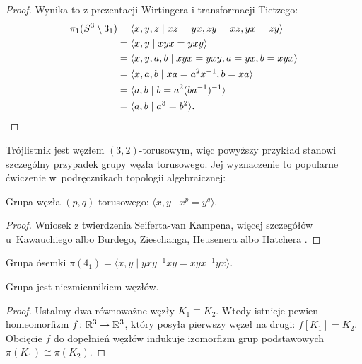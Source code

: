 \begin{proof}
    Wynika to z prezentacji Wirtingera i transformacji Tietzego:
    \begin{align}
        \pi_1(S^3 \setminus 3_1) & = \langle x, y, z \mid xz = yx, zy = xz, yx = zy \rangle \\
                                 & = \langle x, y \mid xyx = yxy \rangle \\
                                 & = \langle x, y, a, b \mid xyx = yxy, a = yx, b = xyx \rangle \\
                                 & = \langle x, a, b \mid xa = a^2x^{-1}, b = xa \rangle \\
                                 & = \langle a, b \mid b = a^2(ba^{-1})^{-1} \rangle \\
                                 & = \langle a, b \mid a^3 = b^2 \rangle.
                                 \qedhere
    \end{align}
\end{proof}

Trójlistnik jest węzłem $(3, 2)$-torusowym, więc powyższy przykład stanowi szczególny przypadek grupy węzła torusowego.
Jej wyznaczenie to popularne ćwiczenie w~podręcznikach topologii algebraicznej:

\begin{example}
    Grupa węzła $(p,q)$-torusowego: $\langle x, y \mid x^p = y^q \rangle$.
\end{example}

\begin{proof}
    Wniosek z twierdzenia Seiferta-van Kampena, więcej szczegółów u~Kawauchiego \cite[s. 77]{kawauchi1996} albo Burdego, Zieschanga, Heusenera \cite[s. 49]{burde2014} albo Hatchera \cite[s. 47]{hatcher2002}.
\end{proof}

\begin{example}
    Grupa ósemki $\pi(4_1) = \langle x, y \mid yxy^{{-1}}xy=xyx^{{-1}}yx \rangle$.
\end{example}

\begin{proposition}
    \label{prop:knot_group_invariant}%
    Grupa jest niezmiennikiem węzłów.
\end{proposition}

\begin{proof}
    Ustalmy dwa równoważne węzły $K_1 \equiv K_2$.
    Wtedy istnieje pewien homeomorfizm $f \colon \mathbb R^3 \to \mathbb R^3$, który posyła pierwszy węzeł na drugi: $f[K_1] = K_2$.
    Obcięcie $f$ do dopełnień węzłów indukuje izomorfizm grup podstawowych $\pi(K_1) \cong \pi(K_2)$.
\end{proof}

